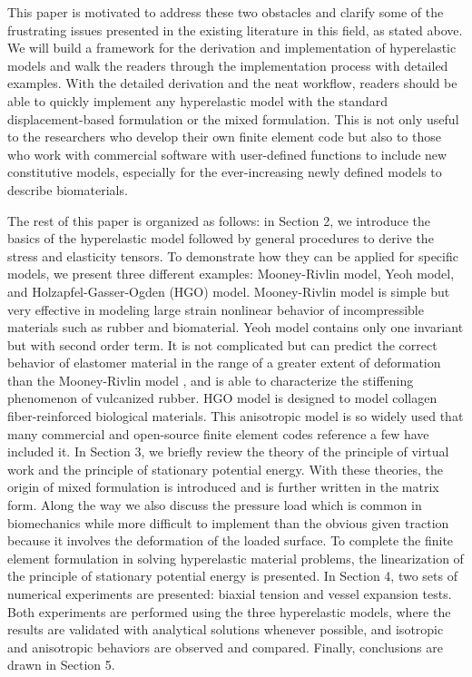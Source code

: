 This paper is motivated to address these two obstacles and clarify some of the frustrating issues presented in the existing literature in this field, as stated above. We will build a framework for the derivation and implementation of hyperelastic models and walk the readers through the implementation process with detailed examples. With the detailed derivation and the neat workflow, readers should be able to quickly implement any hyperelastic model with the standard displacement-based formulation or the mixed formulation. This is not only useful to the researchers who develop their own finite element code but also to those who work with commercial software with user-defined functions to include new constitutive models, especially for the ever-increasing newly defined models to describe biomaterials.

The rest of this paper is organized as follows: in Section 2, we introduce the basics of the hyperelastic model followed by general procedures to derive the stress and elasticity tensors. To demonstrate how they can be applied for specific models, we present three different examples: Mooney-Rivlin model, Yeoh model, and Holzapfel-Gasser-Ogden (HGO) model. Mooney-Rivlin model is simple but very effective in modeling large strain nonlinear behavior of incompressible materials such as rubber and biomaterial. Yeoh model contains only one invariant but with second order term. It is not complicated but can predict the correct behavior of elastomer material in the range of a greater extent of deformation than the Mooney-Rivlin model \cite{Gajewski}, and is able to characterize the stiffening phenomenon of vulcanized rubber. HGO model is designed to model collagen fiber-reinforced biological materials. This anisotropic model is so widely used that many commercial and open-source finite element codes {\color{red} reference a few} have included it. In Section 3, we briefly review the theory of the principle of virtual work and the principle of stationary potential energy. With these theories, the origin of mixed formulation is introduced and is further written in the matrix form. Along the way we also discuss the pressure load which is common in biomechanics while more difficult to implement than the obvious given traction because it involves the deformation of the loaded surface. To complete the finite element formulation in solving hyperelastic material problems, the linearization of the principle of stationary potential energy is presented. In Section 4, two sets of numerical experiments are presented: biaxial tension and vessel expansion tests. Both experiments are performed using the three hyperelastic models, where the results are validated with analytical solutions whenever possible, and isotropic and anisotropic behaviors are observed and compared. Finally, conclusions are drawn in Section 5. %




 



